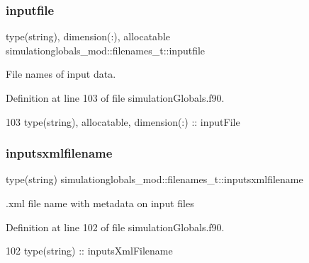\subsubsection{\texorpdfstring{inputfile}{inputfile}}
{\footnotesize\ttfamily type(string), dimension(\+:), allocatable simulationglobals\+\_\+mod\+::filenames\+\_\+t\+::inputfile\hspace{0.3cm}{\ttfamily [private]}}



File names of input data. 



Definition at line 103 of file simulation\+Globals.\+f90.


\begin{DoxyCode}
103         \textcolor{keywordtype}{type}(string), \textcolor{keywordtype}{allocatable}, \textcolor{keywordtype}{dimension(:)} :: inputFile
\end{DoxyCode}
\mbox{\label{structsimulationglobals__mod_1_1filenames__t_aef0d56123bd40e7f6a485680bad46345}} 
\subsubsection{\texorpdfstring{inputsxmlfilename}{inputsxmlfilename}}
{\footnotesize\ttfamily type(string) simulationglobals\+\_\+mod\+::filenames\+\_\+t\+::inputsxmlfilename\hspace{0.3cm}{\ttfamily [private]}}



.xml file name with metadata on input files 



Definition at line 102 of file simulation\+Globals.\+f90.


\begin{DoxyCode}
102         \textcolor{keywordtype}{type}(string) :: inputsXmlFilename
\end{DoxyCode}
\mbox{\label{structsimulationglobals__mod_1_1filenames__t_a5af6fa9ef520239ea544e0241a03259d}} 
